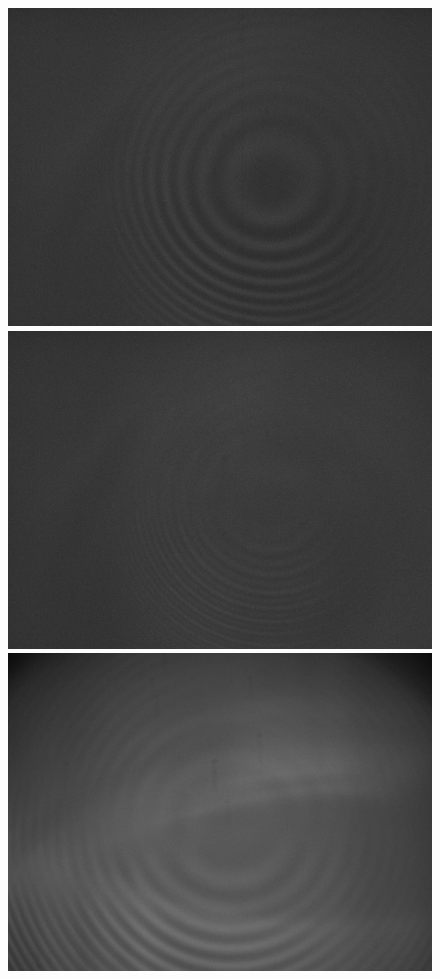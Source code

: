 \documentclass{article}
\begin{document}
\begin{figure}[H]
    \includegraphics[scale = 0.1]{9.jpg}
    \includegraphics[scale = 0.1]{10.jpg}
    \includegraphics[scale = 0.1]{11.jpg}

\end{figure}
\end{document}
